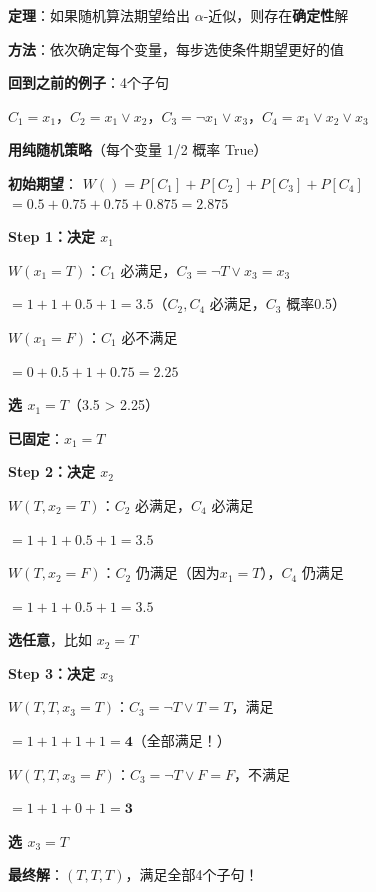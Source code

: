 \documentclass[12pt, a4paper]{ctexart}
\begin{document}
\begin{blackboard}

\textbf{定理}：如果随机算法期望给出 $\alpha$-近似，则存在\textbf{确定性}解

\textbf{方法}：依次确定每个变量，每步选使条件期望更好的值

\end{blackboard}

\begin{blackboard}

\textbf{回到之前的例子}：4个子句

$C_1 = x_1$，$C_2 = x_1 \lor x_2$，$C_3 = \neg x_1 \lor x_3$，$C_4 = x_1 \lor x_2 \lor x_3$

\textbf{用纯随机策略}（每个变量 1/2 概率 True）

\textbf{初始期望}：
$W() = P[C_1] + P[C_2] + P[C_3] + P[C_4]$
$= 0.5 + 0.75 + 0.75 + 0.875 = 2.875$

\textbf{Step 1：决定 $x_1$}

$W(x_1 = T)$：$C_1$ 必满足，$C_3 = \neg T \lor x_3 = x_3$

$= 1 + 1 + 0.5 + 1 = 3.5$（$C_2, C_4$ 必满足，$C_3$ 概率0.5）

$W(x_1 = F)$：$C_1$ 必不满足

$= 0 + 0.5 + 1 + 0.75 = 2.25$

\textbf{选 $x_1 = T$}（3.5 > 2.25）

\end{blackboard}

\begin{blackboard}

\textbf{已固定}：$x_1 = T$

\textbf{Step 2：决定 $x_2$}

$W(T, x_2 = T)$：$C_2$ 必满足，$C_4$ 必满足

$= 1 + 1 + 0.5 + 1 = 3.5$

$W(T, x_2 = F)$：$C_2$ 仍满足（因为$x_1=T$），$C_4$ 仍满足

$= 1 + 1 + 0.5 + 1 = 3.5$

\textbf{选任意}，比如 $x_2 = T$

\textbf{Step 3：决定 $x_3$}

$W(T, T, x_3 = T)$：$C_3 = \neg T \lor T = T$，满足

$= 1 + 1 + 1 + 1 = \mathbf{4}$（全部满足！）

$W(T, T, x_3 = F)$：$C_3 = \neg T \lor F = F$，不满足

$= 1 + 1 + 0 + 1 = \mathbf{3}$

\textbf{选 $x_3 = T$}

\textbf{最终解}：$(T, T, T)$，满足全部4个子句！

\end{blackboard}
\end{document}
